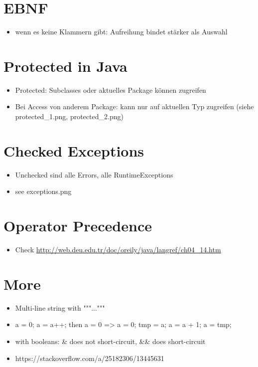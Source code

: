 \documentclass[UTF8]{article}
\begin{document}
\section{EBNF}

\begin{itemize}
    \item wenn es keine Klammern gibt: Aufreihung bindet stärker als Auswahl
\end{itemize}

\section{Protected in Java}

\begin{itemize}
    \item Protected: Subclasses oder aktuelles Package können zugreifen
    \item Bei Access von anderem Package: kann nur auf aktuellen Typ zugreifen (siehe protected_1.png, protected_2.png)
\end{itemize}


\section{Checked Exceptions}

\begin{itemize}
    \item Unchecked sind alle Errors, alle RuntimeExceptions
    \item see exceptions.png
\end{itemize}

\section{Operator Precedence}

\begin{itemize}
    \item Check \url{http://web.deu.edu.tr/doc/oreily/java/langref/ch04_14.htm}
\end{itemize}

\section{More}

\begin{itemize}
    \item Multi-line string with """..."""
    \item a = 0; a = a++; then a = 0 => a = 0; tmp = a; a = a + 1; a = tmp;
    \item with booleans: \& does not short-circuit, \&\& does short-circuit
    \item https://stackoverflow.com/a/25182306/13445631
\end{itemize}
\end{document}
